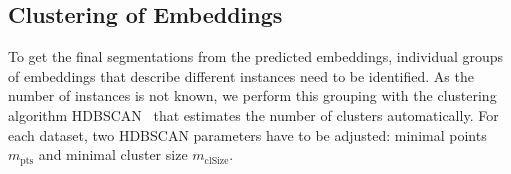 \documentclass[runningheads,a4paper]{llncs}
\newcommand{\christian}[1]{\textcolor{blue}{[#1]}}
\newcommand{\thomas}[1]{\textcolor{purple}{[#1]}}
\begin{document}

\subsection{Clustering of Embeddings}
\label{subsec:clustering}

To get the final segmentations from the predicted embeddings, individual groups of embeddings that describe different instances need to be identified.
As the number of instances is not known, we perform this grouping with the clustering algorithm HDBSCAN~\cite{Campello2015} that estimates the number of clusters automatically.
For each dataset, two HDBSCAN parameters have to be adjusted: minimal points $m_{\text{pts}}$ and minimal cluster size $m_{\text{clSize}}$.
\end{document}

